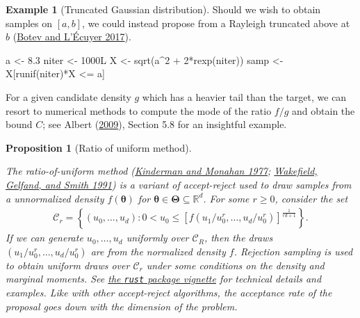 \documentclass[
  11pt,
  letterpaper,
]{scrbook}
\newenvironment{Shaded}{\begin{snugshade}}{\end{snugshade}}
\newcommand{\DecValTok}[1]{\textcolor[rgb]{0.68,0.00,0.00}{#1}}
\newcommand{\FloatTok}[1]{\textcolor[rgb]{0.68,0.00,0.00}{#1}}
\newcommand{\FunctionTok}[1]{\textcolor[rgb]{0.28,0.35,0.67}{#1}}
\newcommand{\NormalTok}[1]{\textcolor[rgb]{0.00,0.23,0.31}{#1}}
\newcommand{\OtherTok}[1]{\textcolor[rgb]{0.00,0.23,0.31}{#1}}
\newcommand{\SpecialCharTok}[1]{\textcolor[rgb]{0.37,0.37,0.37}{#1}}
\theoremstyle{definition}
\newtheorem{example}{Example}[chapter]
\theoremstyle{definition}
\theoremstyle{definition}
\theoremstyle{plain}
\newtheorem{proposition}{Proposition}[chapter]
\theoremstyle{remark}
\begin{document}
\begin{example}[Truncated Gaussian
distribution]
Should we wish to obtain samples on \([a,b]\), we could instead propose
from a Rayleigh truncated above at \(b\)
(\protect\hyperlink{ref-LEcuyer.Botev:2017}{Botev and L'Écuyer 2017}).

\begin{Shaded}
\begin{Highlighting}[]
\NormalTok{a }\OtherTok{\textless{}{-}} \FloatTok{8.3}
\NormalTok{niter }\OtherTok{\textless{}{-}}\NormalTok{ 1000L}
\NormalTok{X }\OtherTok{\textless{}{-}} \FunctionTok{sqrt}\NormalTok{(a}\SpecialCharTok{\^{}}\DecValTok{2} \SpecialCharTok{+} \DecValTok{2}\SpecialCharTok{*}\FunctionTok{rexp}\NormalTok{(niter))}
\NormalTok{samp }\OtherTok{\textless{}{-}}\NormalTok{ X[}\FunctionTok{runif}\NormalTok{(niter)}\SpecialCharTok{*}\NormalTok{X }\SpecialCharTok{\textless{}=}\NormalTok{ a]}
\end{Highlighting}
\end{Shaded}

\end{example}

For a given candidate density \(g\) which has a heavier tail than the
target, we can resort to numerical methods to compute the mode of the
ratio \(f/g\) and obtain the bound \(C\); see Albert
(\protect\hyperlink{ref-Albert:2009}{2009}), Section 5.8 for an
insightful example.

\begin{proposition}[Ratio of uniform
method]\protect\hypertarget{prp-ratio-uniform}{}\label{prp-ratio-uniform}

The ratio-of-uniform method
(\protect\hyperlink{ref-Kinderman.Monahan:1977}{Kinderman and Monahan
1977}; \protect\hyperlink{ref-Wakefield:1991}{Wakefield, Gelfand, and
Smith 1991}) is a variant of accept-reject used to draw samples from a
unnormalized density \(f(\boldsymbol{\theta})\) for
\(\boldsymbol{\theta} \in \boldsymbol{\Theta} \subseteq \mathbb{R}^d\).
For some \(r \geq 0\), consider the set \begin{align*}
\mathcal{C}_r = \left\{ (u_0, \ldots, u_d): 0 < u_0 \leq \left[f(u_1/u_0^r, \ldots, u_d/u_0^r)\right]^{\frac{1}{rd+1}}\right\}.
\end{align*} If we can generate \(u_0, \ldots, u_d\) uniformly over
\(\mathcal{C}_R\), then the draws \((u_1/u_0^r, \ldots, u_d/u_0^r)\) are
from the normalized density \(f\). Rejection sampling is used to obtain
uniform draws over \(\mathcal{C}_r\) under some conditions on the
density and marginal moments. See
\href{https://paulnorthrop.github.io/rust/articles/rust-a-vignette.html}{the
\texttt{rust} package vignette} for technical details and examples. Like
with other accept-reject algorithms, the acceptance rate of the proposal
goes down with the dimension of the problem.

\end{proposition}
\end{document}
